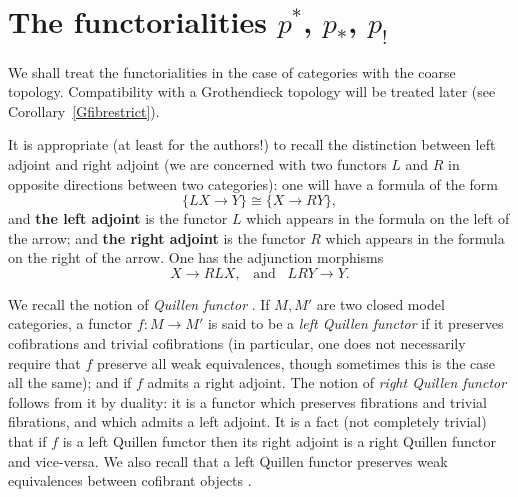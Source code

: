 %

\clearpage
\section{The functorialities \texorpdfstring{$p^{*}$, $p_{*}$, $p_{!}$}{p*, p*, p!}}
\label{fonctorialitepage}

We shall treat the functorialities in the case of categories with the coarse
topology. Compatibility with a Grothendieck topology will be treated later
(see Corollary~\ref{Gfibrestrict}).

It is appropriate (at least for the authors!) to recall the distinction
between left adjoint and right adjoint (we are concerned with two functors $L$
and $R$ in opposite directions between two categories): one will have a
formula of the form
$$
\{ LX \rightarrow Y \} \cong \{ X \rightarrow RY\},
$$
and {\bf the left adjoint} is the functor $L$ which appears in the formula on
the left of the arrow; and
\newline
{\bf the right adjoint} is the functor $R$ which appears in the formula on
the right of the arrow.
\newline
One has the adjunction morphisms
$$
X \rightarrow RL X, \;\;\; \mbox{and} \;\;\; LRY \rightarrow Y.
$$

We recall the notion of {\em Quillen functor} \cite{Quillen}
\cite{DHK} \cite{HoveyBook} \cite{JardineGoerssBook}. If $M,M'$ are two
closed model categories, a functor $f: M\rightarrow M'$ is said to be a {\em
left Quillen functor} if it preserves cofibrations and trivial cofibrations (in
particular, one does not necessarily require that $f$ preserve all weak
equivalences, though sometimes this is the case all the same); and if $f$
admits a right adjoint. The notion of {\em right Quillen functor} follows
from it by duality: it is a functor which preserves fibrations and trivial
fibrations, and which admits a left adjoint.
It is a fact (not completely trivial) \cite{Quillen} that if $f$ is a left
Quillen functor then its right adjoint is a right Quillen functor and
vice-versa.
We also recall that a left Quillen functor preserves weak equivalences
between cofibrant objects \cite{JardineGoerssBook} \cite{DHK} \cite{HoveyBook}.


